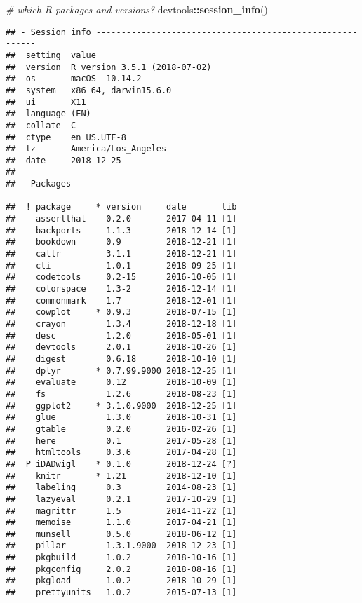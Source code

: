 \documentclass[]{elsarticle} %
\newenvironment{Shaded}{\begin{snugshade}}{\end{snugshade}}
\newcommand{\CommentTok}[1]{\textcolor[rgb]{0.56,0.35,0.01}{\textit{#1}}}
\newcommand{\KeywordTok}[1]{\textcolor[rgb]{0.13,0.29,0.53}{\textbf{#1}}}
\newcommand{\NormalTok}[1]{#1}
\newcommand{\OperatorTok}[1]{\textcolor[rgb]{0.81,0.36,0.00}{\textbf{#1}}}
\begin{document}
\begin{Shaded}
\begin{Highlighting}[]
\CommentTok{# which R packages and versions?}
\NormalTok{devtools}\OperatorTok{::}\KeywordTok{session_info}\NormalTok{()}
\end{Highlighting}
\end{Shaded}

\begin{verbatim}
## - Session info ----------------------------------------------------------
##  setting  value                       
##  version  R version 3.5.1 (2018-07-02)
##  os       macOS  10.14.2              
##  system   x86_64, darwin15.6.0        
##  ui       X11                         
##  language (EN)                        
##  collate  C                           
##  ctype    en_US.UTF-8                 
##  tz       America/Los_Angeles         
##  date     2018-12-25                  
## 
## - Packages --------------------------------------------------------------
##  ! package     * version     date       lib
##    assertthat    0.2.0       2017-04-11 [1]
##    backports     1.1.3       2018-12-14 [1]
##    bookdown      0.9         2018-12-21 [1]
##    callr         3.1.1       2018-12-21 [1]
##    cli           1.0.1       2018-09-25 [1]
##    codetools     0.2-15      2016-10-05 [1]
##    colorspace    1.3-2       2016-12-14 [1]
##    commonmark    1.7         2018-12-01 [1]
##    cowplot     * 0.9.3       2018-07-15 [1]
##    crayon        1.3.4       2018-12-18 [1]
##    desc          1.2.0       2018-05-01 [1]
##    devtools      2.0.1       2018-10-26 [1]
##    digest        0.6.18      2018-10-10 [1]
##    dplyr       * 0.7.99.9000 2018-12-25 [1]
##    evaluate      0.12        2018-10-09 [1]
##    fs            1.2.6       2018-08-23 [1]
##    ggplot2     * 3.1.0.9000  2018-12-25 [1]
##    glue          1.3.0       2018-10-31 [1]
##    gtable        0.2.0       2016-02-26 [1]
##    here          0.1         2017-05-28 [1]
##    htmltools     0.3.6       2017-04-28 [1]
##  P iDADwigl    * 0.1.0       2018-12-24 [?]
##    knitr       * 1.21        2018-12-10 [1]
##    labeling      0.3         2014-08-23 [1]
##    lazyeval      0.2.1       2017-10-29 [1]
##    magrittr      1.5         2014-11-22 [1]
##    memoise       1.1.0       2017-04-21 [1]
##    munsell       0.5.0       2018-06-12 [1]
##    pillar        1.3.1.9000  2018-12-23 [1]
##    pkgbuild      1.0.2       2018-10-16 [1]
##    pkgconfig     2.0.2       2018-08-16 [1]
##    pkgload       1.0.2       2018-10-29 [1]
##    prettyunits   1.0.2       2015-07-13 [1]

\end{verbatim}
\end{document}
